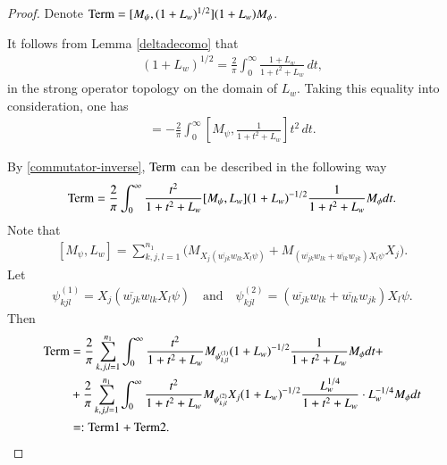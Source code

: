 \documentclass[leqno]{amsart}
\begin{document}
	\begin{proof}
		Denote ${\rm Term}=[M_{\psi},(1+L_{w})^{1/2}](1+L_{w})M_{\phi}$.
		
		It follows from Lemma \ref{deltadecomo} that
		\begin{align*}
			(1+L_{w})^{1/2}=\frac{2}{\pi}\int_{0}^{\infty}\frac{1+L_{w}}{1+t^{2}+L_{w}}\,dt,
		\end{align*}
		in the strong operator topology on the domain of $L_w.$ Taking this equality into consideration, one has
		\begin{align*}
			[M_{\psi},(1+L_{w})^{1/2}]%
			=-\frac{2}{\pi}\int_{0}^{\infty}[M_{\psi},\frac{1}{1+t^{2}+L_{w}}]t^{2}\,dt.
		\end{align*}
		
		By \eqref{commutator-inverse}, ${\rm Term}$ can be described in the following way
		\begin{align*}
			{\rm Term}
			=\frac{2}{\pi}\int_{0}^{\infty}\frac{t^{2}}{1+t^{2}+L_{w}}[M_{\psi},L_{w}](1+L_{w})^{-1/2}
			\frac{1}{1+t^{2}+L_{w}}M_{\phi}dt.
		\end{align*}
		Note that
		\begin{align}\label{ML-commutator}
			[M_{\psi},L_{w}]=\sum_{k,j,l=1}^{n_{1}}\Big(M_{X_{j}(\overline{w_{jk}}w_{lk}X_{l}\psi)}
			+M_{(\overline{w_{jk}}w_{lk}+\overline{w_{lk}}w_{jk})X_{l}\psi}X_{j}\Big).
		\end{align}
		Let
		\begin{align*}
			\psi_{kjl}^{(1)}=X_{j}(\overline{w_{jk}}w_{lk}X_{l}\psi)\quad\mbox{and}\quad
			\psi_{kjl}^{(2)}=(\overline{w_{jk}}w_{lk}+\overline{w_{lk}}w_{jk})X_{l}\psi.
		\end{align*}
		Then
		\begin{align*}
			{\rm Term}
			&=\frac{2}{\pi}\sum_{k,j,l=1}^{n_{1}}\int_{0}^{\infty}\frac{t^{2}}{1+t^{2}+L_{w}}M_{\psi_{kjl}^{(1)}}(1+L_{w})^{-1/2}
			\frac{1}{1+t^{2}+L_{w}}M_{\phi}dt+\\
			&+\frac{2}{\pi}\sum_{k,j,l=1}^{n_{1}}\int_{0}^{\infty}\frac{t^{2}}{1+t^{2}+L_{w}}M_{\psi_{kjl}^{(2)}}X_{j}(1+L_{w})^{-1/2}
			\frac{L_{w}^{1/4}}{1+t^{2}+L_{w}}\cdot L_{w}^{-1/4}M_{\phi}dt\\
			&=:{\rm Term1}+{\rm Term2}.
		\end{align*}
		

\end{proof}
\end{document}
